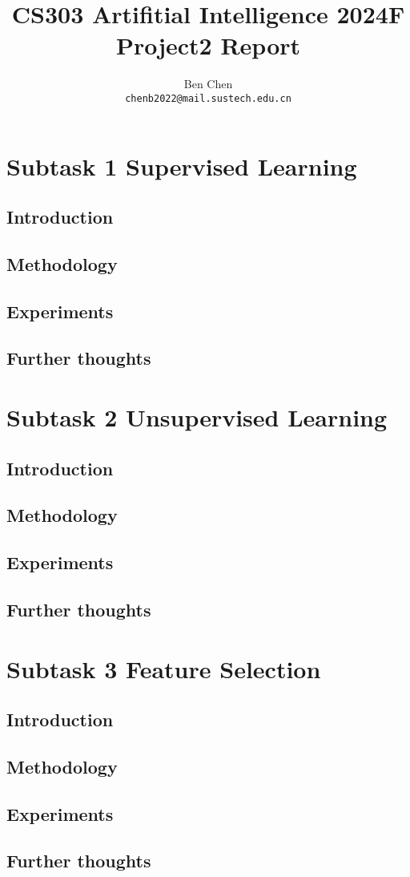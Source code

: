 \documentclass{article}
\title{\textbf{CS303 Artifitial Intelligence 2024F Project2 Report}}
\author{Ben Chen \\ \texttt{chenb2022@mail.sustech.edu.cn}}
\begin{document}
\maketitle

\section{Subtask 1 Supervised Learning}

\subsection{Introduction}

\subsection{Methodology}

\subsection{Experiments}

\subsection{Further thoughts}

\section{Subtask 2 Unsupervised Learning}

\subsection{Introduction}

\subsection{Methodology}

\subsection{Experiments}

\subsection{Further thoughts}

\section{Subtask 3 Feature Selection}

\subsection{Introduction}

\subsection{Methodology}

\subsection{Experiments}

\subsection{Further thoughts}
\end{document}

